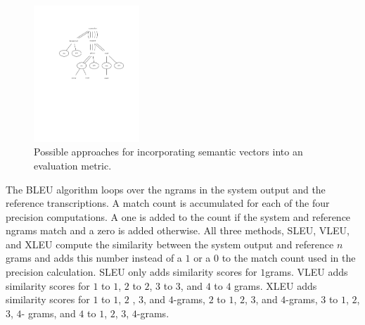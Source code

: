 %

\begin{figure}
  \centering
  \includegraphics[width=\linewidth,height=2.0181in]{approaches.pdf}
  \caption{Possible approaches for incorporating semantic vectors into an evaluation metric.}
  \label{fig:approaches}
\end{figure}


The BLEU algorithm loops over the ngrams in the system output and the reference transcriptions. 
A match count is accumulated for each of the four precision computations. 
A one is added to the count if the system and reference ngrams match and a zero is added otherwise. 
All three methods, SLEU, VLEU, and XLEU compute the similarity between the system output and reference $n$grams and adds this number instead of a $1$ or a $0$ to the match count used in the precision calculation. 
SLEU only adds similarity scores for $1$grams. 
VLEU adds similarity scores for $1$ to $1$, $2$ to $2$, $3$ to $3$,  and $4$ to $4$ grams. 
XLEU adds similarity scores for $1$ to $1$, $2$ , $3$, and $4$-grams, $2$ to $1$, $2$, $3$, and $4$-grams, $3$ to $1$, $2$, $3$, $4$- grams, and $4$ to $1$, $2$, $3$, $4$-grams. 


